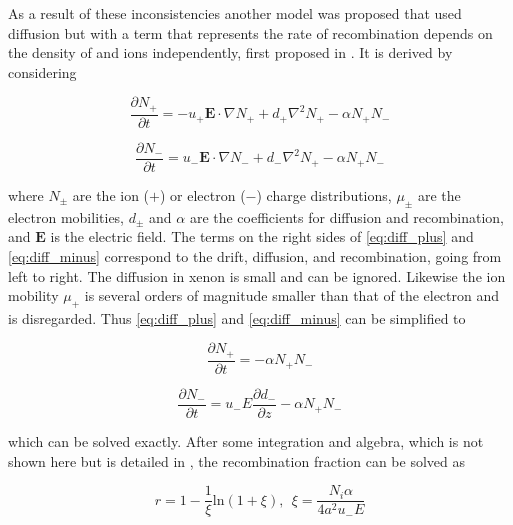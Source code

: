 As a result of these inconsistencies another model was proposed that used diffusion but with a term that represents the rate of
recombination depends on
the density of \electron and ions independently, first proposed in .  It is derived by considering

\begin{equation}
\frac{\partial N_{+}}{\partial t} = -u_{+} \mathbf{E} \cdot \nabla N_{+} + d_{+} \nabla^{2} N_{+} - \alpha N_{+} N_{-}
\label{eq:diff_plus}
\end{equation}

\begin{equation}
\frac{\partial N_{-}}{\partial t} = u_{-} \mathbf{E} \cdot \nabla N_{-} + d_{-} \nabla^{2} N_{+} - \alpha N_{+} N_{-}
\label{eq:diff_minus}
\end{equation}

\noindent where $N_{\pm}$ are the ion ($+$) or electron ($-$) charge distributions, $\mu_{\pm}$ are the electron mobilities, $d_{\pm}$
and $\alpha$
are the coefficients for diffusion and recombination, and $\mathbf{E}$ is the electric field.  The terms on the right sides of
\eqref{eq:diff_plus} and \eqref{eq:diff_minus} correspond to the drift, diffusion, and recombination, going from left to right.  The
diffusion in xenon is small and can be ignored.  Likewise the ion mobility $\mu_{+}$ is several orders of magnitude smaller than that
of the electron and is disregarded.  Thus \eqref{eq:diff_plus} and \eqref{eq:diff_minus} can be simplified to

\begin{equation}
\frac{\partial N_{+}}{\partial t} = - \alpha N_{+} N_{-}
\label{eq:diff_simple_plus}
\end{equation}

\begin{equation}
\frac{\partial N_{-}}{\partial t} = u_{-} E \frac{\partial d_{-}}{\partial z} - \alpha N_{+} N_{-}
\label{eq:diff_simple_minus}
\end{equation}

\noindent which can be solved exactly.  After some integration and algebra, which is not shown here but is detailed in
, the recombination fraction can be solved as

\begin{equation}
r = 1 - \frac{1}{\xi} \mathrm{ln}(1 + \xi),\ \ \xi = \frac{N_{i} \alpha}{4 a^{2} u_{-} E}
\label{eq:ti_recomb}
\end{equation}

